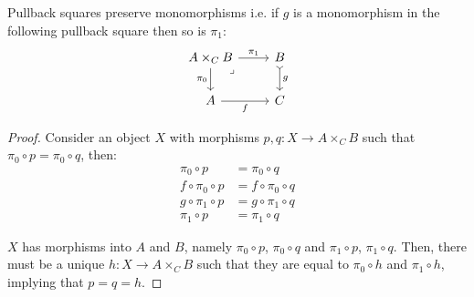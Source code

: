 \begin{theorem}
  Pullback squares preserve monomorphisms i.e. if $g$ is a monomorphism in the
  following pullback square then so is $\pi_1$:
  \[\begin{tikzcd}[ampersand replacement=\&]
    {A\times_CB} \& B \\
    A \& C
    \arrow["g", tail, from=1-2, to=2-2]
    \arrow["f"', from=2-1, to=2-2]
    \arrow["{\pi_0}"', from=1-1, to=2-1]
    \arrow["{\pi_1}", from=1-1, to=1-2]
    \arrow["\lrcorner"{anchor=center, pos=0.125}, draw=none, from=1-1, to=2-2]
  \end{tikzcd}\]

  \begin{proof}
    Consider an object $X$ with morphisms $p, q: X\to A\times_C B$ such that
    $\pi_0 \circ p = \pi_0 \circ q$, then:
    \[
      \begin{aligned}
        \pi_0 \circ p &= \pi_0 \circ q\\
        f \circ \pi_0 \circ p &= f \circ \pi_0 \circ q\\
        g \circ \pi_1 \circ p &= g \circ \pi_1 \circ q\\
        \pi_1 \circ p &= \pi_1 \circ q
      \end{aligned}
    \]

    $X$ has morphisms into $A$ and $B$, namely $\pi_0 \circ p$, $\pi_0 \circ q$
    and $\pi_1 \circ p$, $\pi_1 \circ q$. Then, there must be a unique $h: X\to
    A\times_C B$ such that they are equal to $\pi_0 \circ h$ and $\pi_1 \circ
    h$, implying that $p=q=h$.
  \end{proof}
\end{theorem}